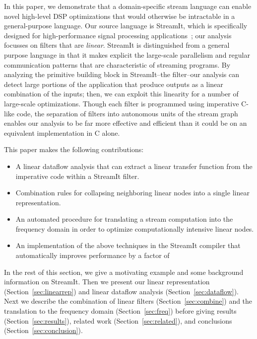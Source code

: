 In this paper, we demonstrate that a domain-specific stream language
can enable novel high-level DSP optimizations that would otherwise be
intractable in a general-purpose language.  Our source language is
StreamIt, which is specifically designed for high-performance signal
processing applications~\cite{streamit-asplos,streamitcc}; our
analysis focusses on filters that are {\it linear}.  StreamIt is
distinguished from a general purpose language in that it makes
explicit the large-scale parallelism and regular communication
patterns that are characteristic of streaming programs.  By analyzing
the primitive building block in StreamIt--the filter--our analysis can
detect large portions of the application that produce outputs as a
linear combination of the inputs; then, we can exploit this linearity
for a number of large-scale optimizations.  Though each filter is
programmed using imperative C-like code, the separation of filters
into autonomous units of the stream graph enables our analysis to be
far more effective and efficient than it could be on an equivalent
implementation in C alone.

This paper makes the following contributions:
\begin{itemize}

\item A linear dataflow analysis that can extract a linear transfer
function from the imperative code within a StreamIt filter.

\item Combination rules for collapsing neighboring linear nodes into a
single linear representation.

\item An automated procedure for translating a stream computation into
the frequency domain in order to optimize computationally intensive
linear nodes.

\item An implementation of the above techniques in the StreamIt
compiler that automatically improves performance by a factor of

\end{itemize}

In the rest of this section, we give a motivating example and some
background information on StreamIt.  Then we present our linear
representation (Section~\ref{sec:linearrep}) and linear dataflow
analysis (Section~\ref{sec:dataflow}).  Next we describe the
combination of linear filters (Section~\ref{sec:combine}) and the
translation to the frequency domain (Section~\ref{sec:freq}) before
giving results (Section~\ref{sec:results}), related work
(Section~\ref{sec:related}), and conclusions
(Section~\ref{sec:conclusion}).

